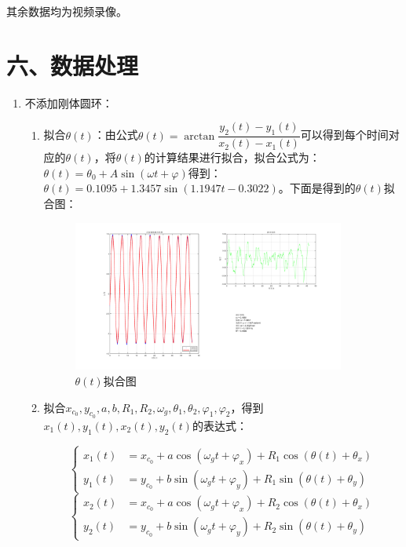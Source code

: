 \documentclass[11pt]{article}
\begin{document}
其余数据均为视频录像。

\section*{六、数据处理}

\begin{enumerate}
    \item 不添加刚体圆环：
    \begin{enumerate}
        \item 拟合$\theta(t)$：由公式$\theta(t)=\arctan\dfrac{y_2(t)-y_1(t)}{x_2(t)-x_1(t)}$可以得到每个时间对应的$\theta(t)$，将$\theta(t)$的计算结果进行拟合，拟合公式为：$\theta(t)=\theta_0+A\sin(\omega t+\varphi)$得到：$\theta(t)=0.1095+1.3457\sin(1.1947t-0.3022)$。下面是得到的$\theta(t)$拟合图：

        \begin{figure}[H]
            \centering
            \includegraphics[width=0.9\textwidth]{Figs/Ex1.theta.png}
            \caption{$\theta(t)$拟合图}
        \end{figure}
        \item 拟合$x_{c_0},y_{c_0},a,b,R_1,R_2,\omega_{g},\theta_1,\theta_2,\varphi_1,\varphi_2$，得到$x_1(t),y_1(t),x_2(t),y_2(t)$的表达式：

        $$\left\{
        \begin{aligned}
            x_1(t)&=x_{c_0}+a\cos(\omega_{g}t+\varphi_x)+R_1\cos(\theta(t)+\theta_x) \\
            y_1(t)&=y_{c_0}+b\sin(\omega_{g}t+\varphi_y)+R_1\sin(\theta(t)+\theta_y)
        \end{aligned}
        \right.$$
        $$\left\{
        \begin{aligned}
            x_2(t)&=x_{c_0}+a\cos(\omega_{g}t+\varphi_x)+R_2\cos(\theta(t)+\theta_x) \\
            y_2(t)&=y_{c_0}+b\sin(\omega_{g}t+\varphi_y)+R_2\sin(\theta(t)+\theta_y)
        \end{aligned}
        \right.$$


\end{enumerate}
\end{enumerate}
\end{document}
